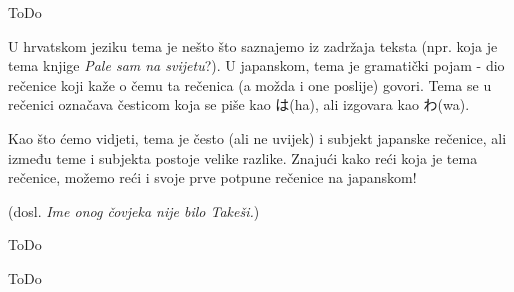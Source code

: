 	
	ToDo
	
	
	U hrvatskom jeziku tema je nešto što saznajemo iz zadržaja teksta (npr. koja je tema knjige \textit{Pale sam na svijetu}?). U japanskom, tema je gramatički pojam - dio rečenice koji kaže o čemu ta rečenica (a možda i one poslije) govori. Tema se u rečenici označava česticom koja se piše kao は(ha), ali izgovara kao わ(wa)\footnotemark[2].
	
	
	Kao što ćemo vidjeti, tema je često (ali ne uvijek) i subjekt japanske rečenice, ali između teme i subjekta postoje velike razlike. Znajući kako reći koja je tema rečenice, možemo reći i svoje prve potpune rečenice na japanskom!
	
	\begin{reibun}
		 (dosl. \textit{Ime onog čovjeka nije bilo Takeši.})
	\end{reibun}

	
	ToDo
	
	
	ToDo
	

